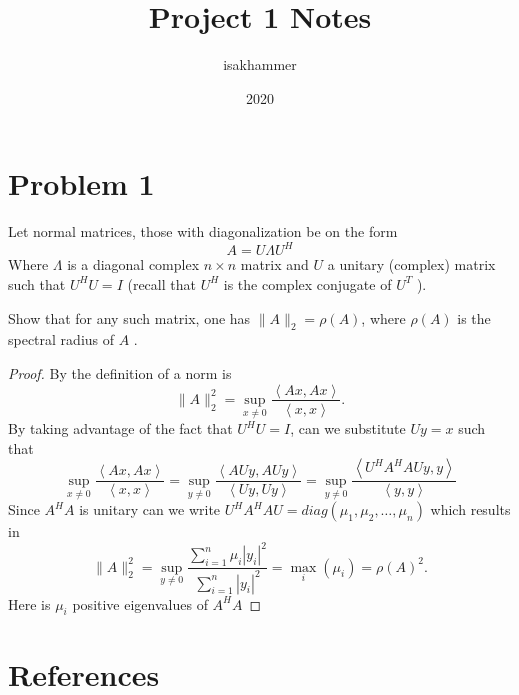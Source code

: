 \documentclass{article}
\title{Project 1 Notes}
\author{isakhammer }
\date{2020}
\theoremstyle{remark}
\newcommand{\newpara}
  {
  \vskip 0.4cm
  }
\begin{document}
\maketitle
\tableofcontents
\newpage

\newpage
\section{Problem 1}%
\label{sec:problem_1}

Let normal matrices, those with diagonalization be on the form \[
A = U \Lambda U^{H} 
\] 
Where $\Lambda $ is a diagonal complex $n\times n $ matrix and $U$ a unitary (complex) matrix such that $U ^{H} U = I$ (recall that $U^{H}$ is the complex conjugate of $U^{T}$ ).
\newpara
Show that for any such matrix, one has $\|A\|_{2} = \rho \left( A \right)$, where $\rho \left( A \right) $ is the spectral radius of $A$ .

\begin{proof}
  By the definition of a norm is \[
  \|A\|_{2}^{2} = \sup_{x \neq 0} \frac{\left<Ax, Ax \right>}{ \left<x,x \right>} .
  \] 
  By taking advantage of the fact that $U^{H} U = I$, can we substitute $Uy =  x$ such that \[
    \sup_{x \neq 0} \frac{\left<Ax, Ax \right>}{\left<x,x \right>}  = \sup_{y\neq 0}  \frac{\left<AU y, A U y \right>}{ \left<U y, Uy \right>} = \sup_{y \neq 0} \frac{\left<U^{H} A^{H} A U y,y \right>}{\left<y,y \right>} 
  \] 
   Since $A^{H} A $ is unitary can we write $U^{H} A^{H} A U = diag\left( \mu _{1} , \mu _{2}, \ldots, \mu _{n} \right)$ which results in \[
   \|A\|_{2}^{2} = \sup_{ y \neq 0}  \frac{\sum_{i=1}^{n}  \mu _{i} \left| y_{i} \right|^2}{ \sum_{i=1}^{n}  \left| y_{i} \right|^2}  = \max _{i} \left( \mu _{i} \right) = \rho \left( A \right)^2.
   \] 
   Here is $\mu _{i}$ positive eigenvalues of $A^{H} A$
 
\end{proof}






\newpage
\section{References}%
\label{sec:references}



\end{document}
